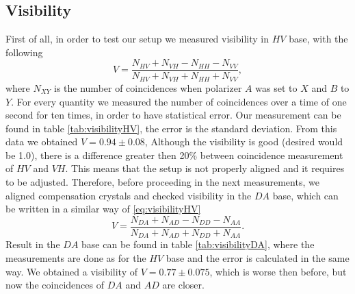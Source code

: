 \documentclass[a4paper,10pt]{article}
\begin{document}
\subsection{Visibility}
First of all, in order to test our setup we measured visibility in $HV$ base, with the following
\begin{equation}\label{eq:visibilityHV}V = \frac{N_{HV}+N_{VH}-N_{HH}-N_{VV}}{N_{HV}+N_{VH}+N_{HH}+N_{VV}},\end{equation}
where $N_{XY}$ is the number of coincidences when polarizer $A$ was set to $X$ and $B$ to $Y$. For every quantity we measured the number of coincidences over a time of one second for ten times, in order to have statistical error. Our measurement can be found in table \ref{tab:visibilityHV}, the error is the standard deviation. From this data we obtained $V = 0.94 \pm 0.08$,
Although the visibility is good (desired would be 1.0), there is a difference greater then 20\% between coincidence measurement of $HV$ and $VH$. This means that the setup is not properly aligned and it requires to be adjusted. Therefore, before proceeding in the next measurements, we aligned compensation crystals and checked visibility in the $DA$ base, which can be written in a similar way of \eqref{eq:visibilityHV}
\begin{equation}V = \frac{N_{DA}+N_{AD}-N_{DD}-N_{AA}}{N_{DA}+N_{AD}+N_{DD}+N_{AA}}.\end{equation}
Result in the $DA$ base can be found in table \ref{tab:visibilityDA}, where the measurements are done as for the $HV$ base and the error is calculated in the same way. We obtained a visibility of $V =  0.77\pm0.075$, which is worse then before, but now the coincidences of $DA$ and $AD$ are closer.
\end{document}
